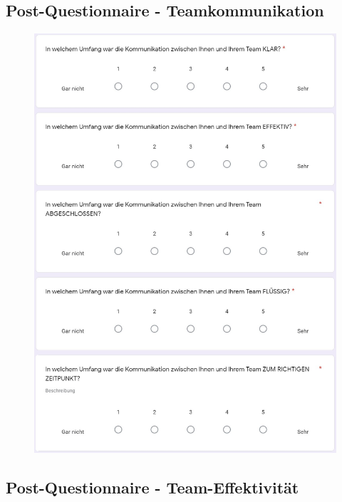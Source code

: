 \documentclass[a4paper,11pt]{article}%
\renewcommand{\\}{\vspace*{0.5\baselineskip} \newline}
\begin{document}
{{\newpage
\subsection{Post-Questionnaire - Teamkommunikation}	
\label{Post-Questionnaire - Teamkommunikation}	

\begin{figure}[H]
	\centering
		\begin{footnotesize}
			\includegraphics[scale=0.4]{Abbildungen/Fragebogen/Post-Questionnaire/PQKQ1}
		\end{footnotesize}
	\end{figure}	

\newpage
\subsection{Post-Questionnaire - Team-Effektivität}	
\label{Post-Questionnaire - Team-Effektivität}	

}}
\end{document}
